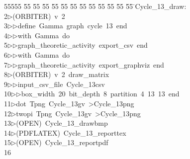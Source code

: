 %
%
\begin{tabbing}
55555 \= 55 \= 55 \= 55 \= 55 \= 55 \= 55 \= 55 \= 55 \= 55 \= 55 \= 55 \= 55 \= \>Cycle\_13\_draw:\\[0pt]
2\>$\triangleright$\>(ORBITER)\ v\ 2\ \\[0pt]
3\>$\triangleright$\>$\triangleright$\>define\ Gamma\ graph\ cycle\ 13\ end\ \\[0pt]
4\>$\triangleright$\>$\triangleright$\>with\ Gamma\ do\ \\[0pt]
5\>$\triangleright$\>$\triangleright$\>graph\_theoretic\_activity\ export\_csv\ end\ \\[0pt]
6\>$\triangleright$\>$\triangleright$\>with\ Gamma\ do\ \\[0pt]
7\>$\triangleright$\>$\triangleright$\>graph\_theoretic\_activity\ export\_graphviz\ end\\[0pt]
8\>$\triangleright$\>(ORBITER)\ v\ 2\ draw\_matrix\ \\[0pt]
9\>$\triangleright$\>$\triangleright$\>input\_csv\_file\ Cycle\_13csv\ \\[0pt]
10\>$\triangleright$\>$\triangleright$\>box\_width\ 20\ bit\_depth\ 8\ partition\ 4\ 13\ 13\ end\\[0pt]
11\>$\triangleright$\>dot\ Tpng\ Cycle\_13gv\ {\textgreater}Cycle\_13png\\[0pt]
12\>$\triangleright$\>twopi\ Tpng\ Cycle\_13gv\ {\textgreater}Cycle\_13png\\[0pt]
13\>$\triangleright$\>(OPEN)\ Cycle\_13\_drawbmp\\[0pt]
14\>$\triangleright$\>(PDFLATEX)\ Cycle\_13\_reporttex\\[0pt]
15\>$\triangleright$\>(OPEN)\ Cycle\_13\_reportpdf\\[0pt]
16\>\end{tabbing}
